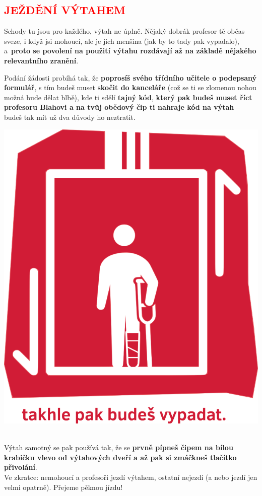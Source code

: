 \documentclass[a5paper, twoside]{article}
\newcommand{\podnadpis}[2]{
  \subsection*{\textcolor{#2}{#1}}
}
\begin{document}
\podnadpis{JEŽDĚNÍ VÝTAHEM}{red}
\begin{minipage}{0.65\linewidth}
	\par Schody tu jsou pro každého, výtah ne úplně. Nějaký dobrák profesor tě občas sveze, i když jsi mohoucí, ale je jich menšina (jak by to tady pak vypadalo), a~\textbf{proto se povolení na použití výtahu rozdávají až na základě nějakého relevantního zranění}.
  \par Podání žádosti probíhá tak, že \textbf{poprosíš svého třídního učitele o podepsaný formulář}, s tím budeš muset \textbf{skočit do kanceláře} (což se ti se zlomenou nohou možná bude dělat blbě), kde ti sdělí \textbf{tajný kód}, \textbf{který pak budeš muset říct profesoru Blahovi a na tvůj
		obědový čip ti nahraje kód na výtah} -- budeš tak mít už dva důvody ho neztratit.
\end{minipage}
\begin{minipage}{0.35\linewidth}
	\centering
	\includegraphics[width=0.90\linewidth]{vytah.png}
\end{minipage}
\vspace{0pt}\\
\noindent
Výtah samotný se pak používá tak, že se \textbf{prvně pípneš čipem na bílou krabičku
	vlevo od výtahových dveří a až pak si zmáčkneš tlačítko přivolání}. \\
Ve zkratce: nemohoucí a profesoři jezdí výtahem, ostatní nejezdí (a nebo jezdí jen
velmi opatrně). Přejeme pěknou jízdu!
\end{document}
